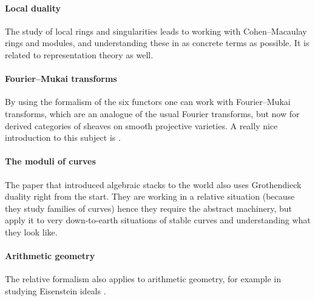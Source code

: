 \documentclass[10pt,a4paper]{article}
\begin{document}
\paragraph{Local duality}
The study of local rings and singularities leads to working with Cohen--Macaulay rings and modules, and understanding these in as concrete terms as possible. It is related to representation theory as well.

\paragraph{Fourier--Mukai transforms}
By using the formalism of the six functors one can work with Fourier--Mukai transforms, which are an analogue of the usual Fourier transforms, but now for derived categories of sheaves on smooth projective varieties. A really nice introduction to this subject is \cite{huybrechts-fourier-mukai}.

\paragraph{The moduli of curves}
The paper that introduced algebraic stacks to the world \cite{deligne-mumford-irreducibility-moduli-of-curves} also uses Grothendieck duality right from the start. They are working in a relative situation (because they study families of curves) hence they require the abstract machinery, but apply it to very down-to-earth situations of stable curves and understanding what they look like.

\paragraph{Arithmetic geometry}
The relative formalism also applies to arithmetic geometry, for example in studying Eisenstein ideals \cite{mazur-modular-curves-eisenstein-ideal}.


\printbibliography
\end{document}
